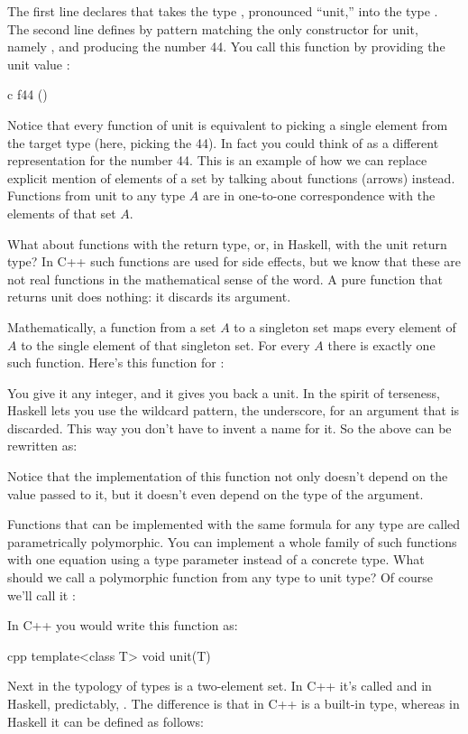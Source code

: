 The first line declares that  takes the type \code{()},
pronounced ``unit,'' into the type . The second line
defines  by pattern matching the only constructor for unit,
namely \code{()}, and producing the number 44. You call this function
by providing the unit value \code{()}:

\begin{snip}{c}
f44 ()
\end{snip}
Notice that every function of unit is equivalent to picking a single
element from the target type (here, picking the  44). In
fact you could think of  as a different representation for
the number 44. This is an example of how we can replace explicit mention
of elements of a set by talking about functions (arrows) instead.
Functions from unit to any type $A$ are in one-to-one correspondence with
the elements of that set $A$.

What about functions with the  return type, or, in Haskell,
with the unit return type? In C++ such functions are used for side
effects, but we know that these are not real functions in the
mathematical sense of the word. A pure function that returns unit does
nothing: it discards its argument.

Mathematically, a function from a set $A$ to a singleton set maps every
element of $A$ to the single element of that singleton set. For every $A$
there is exactly one such function. Here's this function for
:

You give it any integer, and it gives you back a unit. In the spirit of
terseness, Haskell lets you use the wildcard pattern, the underscore,
for an argument that is discarded. This way you don't have to invent a
name for it. So the above can be rewritten as:

Notice that the implementation of this function not only doesn't depend
on the value passed to it, but it doesn't even depend on the type of the
argument.

Functions that can be implemented with the same formula for any type are
called parametrically polymorphic. You can implement a whole family of
such functions with one equation using a type parameter instead of a
concrete type. What should we call a polymorphic function from any type
to unit type? Of course we'll call it :

In C++ you would write this function as:

\begin{snip}{cpp}
template<class T>
void unit(T) {}
\end{snip}
Next in the typology of types is a two-element set. In C++ it's called
 and in Haskell, predictably, . The difference
is that in C++  is a built-in type, whereas in Haskell it
can be defined as follows:

